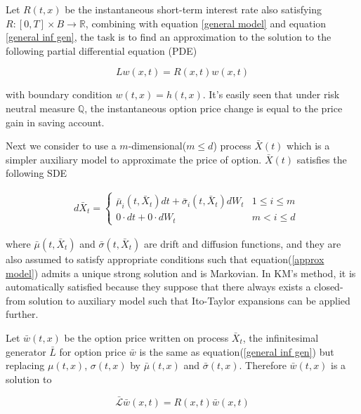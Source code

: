 Let $R(t,x)$ be the instantaneous short-term interest rate also satisfying $R:[0,T] \times B \rightarrow \mathbb R$, combining with equation \eqref{general model} and equation \eqref{general inf gen}, the task is to find an approximation to the solution to the following partial differential equation (PDE)

\begin{equation}\label{pde under general}
    Lw(x,t) = R(x,t)w(x,t)
\end{equation}

\noindent with boundary condition $w(t,x) = h(t,x)$. It's easily seen that under risk neutral measure $\mathbb Q$, the instantaneous option price change is equal to the price gain in saving account. 

Next we consider to use a $m$-dimensional($m \leq d$) process $\bar{X}(t)$ which is a simpler auxiliary model to approximate the price of option. $\bar{X}(t)$ satisfies the following SDE

\begin{equation}\label{approx model}
    \begin{aligned}
        &d\bar{X}_t= \begin{cases}   \bar{\mu}_i(t, \bar{X}_t) dt + \bar{\sigma}_i(t, \bar{X}_t) dW_t & 1 \leq i \leq m \\
        0 \cdot dt + 0 \cdot dW_t & m < i \leq d \end{cases}
        \end{aligned}
\end{equation}

\noindent where $\bar{\mu}(t, \bar{X}_t)$ and $\bar{\sigma}(t, \bar{X}_t)$ are drift and diffusion functions, and they are also assumed to satisfy appropriate conditions such that equation(\ref{approx model}) admits a unique strong solution and is Markovian. In KM's method, it is automatically satisfied because they suppose that there always exists a closed-from solution to auxiliary model such that Ito-Taylor expansions can be applied further.

Let $\bar{w}(t,x)$ be the option price written on process $\bar{X}_t$, the infinitesimal generator $\bar{L}$ for option price $\bar{w}$ is the same as equation(\ref{general inf gen}) but replacing $\mu(t,x)$, $\sigma(t,x)$ by $\bar{\mu}(t,x)$ and $\bar{\sigma}(t,x)$. Therefore $\bar{w}(t,x)$ is a solution to

\begin{equation}\label{pde under approx}
    \mathcal{\bar{L}}\bar{w}(x,t) = R(x,t)\bar{w}(x,t)
\end{equation}

